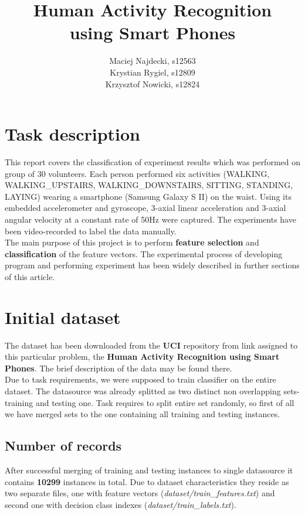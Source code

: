 \documentclass[12pt,a4paper]{article}
\begin{document}
\author{
	Maciej Najdecki, s12563\\
	Krystian Rygiel, s12809\\
	Krzysztof Nowicki, s12824
}
\title{
	Human Activity Recognition\\
	using Smart Phones
}
\maketitle
\newpage

\tableofcontents
\newpage

\section{Task description}
This report covers the classification of experiment results which was performed on group of 30 volunteers. Each person performed six activities (WALKING, WALKING{\_}UPSTAIRS, WALKING{\_}DOWNSTAIRS, SITTING, STANDING, LAYING) wearing a smartphone (Samsung Galaxy S II) on the waist. Using its embedded accelerometer and gyroscope, 3-axial linear acceleration and 3-axial angular velocity at a constant rate of 50Hz were captured. The experiments have been video-recorded to label the data manually.\\
The main purpose of this project is to perform \textbf{feature selection} and \textbf{classification} of the feature vectors. The experimental process of developing program and performing experiment has been widely described in further sections of this article.

\section{Initial dataset}
The dataset has been downloaded from the \textbf{UCI} repository from link assigned to this particular problem, the \textbf{Human Activity Recognition using Smart Phones}. The brief description of the data may be found there.\\
Due to task requirements, we were supposed to train classifier on the entire dataset. The datasource was already splitted as two distinct non overlapping sets-  training and testing one. Task requires to split entire set randomly, so first of all we have merged sets to the one containing all training and testing instances.\\
\subsection{Number of records}
After successful merging of training and testing instances to single datasource it contains \textbf{10299} instances in total. Due to dataset characteristics they reside as two separate files, one with feature vectors  (\textit{dataset/train{\_}features.txt}) and second one with decision class indexes (\textit{dataset/train{\_}labels.txt}).
\end{document}

